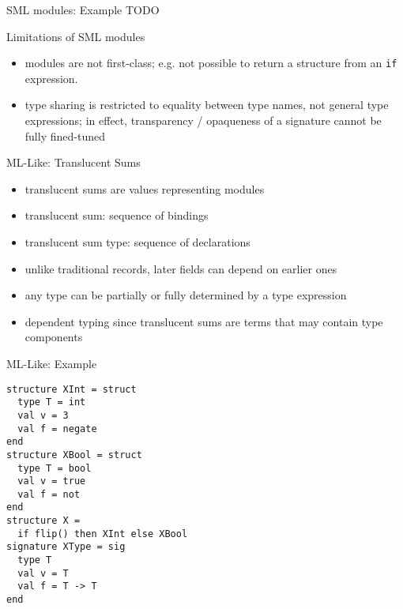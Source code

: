 \documentclass{beamer}
\begin{document}
\begin{frame}[fragile]{SML modules: Example}
TODO
\end{frame}

\begin{frame}{Limitations of SML modules}
\begin{itemize}
\item modules are not first-class; e.g. not possible to return a
  structure from an {\tt if} expression.
\item type sharing is restricted to equality between type names, not
  general type expressions; in effect, transparency / opaqueness of a
  signature cannot be fully fined-tuned
\end{itemize}
\end{frame}

\begin{frame}{ML-Like: Translucent Sums}
\begin{itemize}
\item translucent sums are values representing modules
\item translucent sum: sequence of bindings
\item translucent sum type: sequence of declarations
\item unlike traditional records, later fields can depend on earlier ones
\item any type can be partially or fully determined by a type expression
\item dependent typing since translucent sums are terms that may contain type components
\end{itemize}
\end{frame}

\begin{frame}[fragile]{ML-Like: Example}
\begin{verbatim}
structure XInt = struct
  type T = int
  val v = 3
  val f = negate
end
structure XBool = struct
  type T = bool
  val v = true
  val f = not
end
structure X =
  if flip() then XInt else XBool
signature XType = sig
  type T
  val v = T
  val f = T -> T
end
\end{verbatim}
\end{frame}

\end{document}
